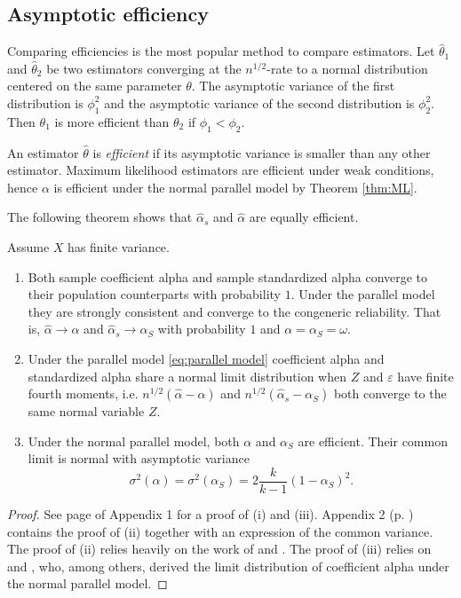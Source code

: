\documentclass[twoside]{article}
\begin{document}
\subsection{Asymptotic efficiency}
Comparing efficiencies is the most popular method to compare estimators. Let $\hat{\theta}_1$ and $\hat{\theta}_2$ be two estimators converging at the $n^{1/2}$-rate to a normal distribution centered on the same parameter $\theta$. The asymptotic variance of the first distribution is $\phi_1^2$ and the asymptotic variance of the second distribution is $\phi_2^2$. Then $\theta_1$ is more efficient than $\theta_2$ if $\phi_1<\phi_2$. 

An estimator $\hat{\theta}$ is \textit{efficient} \citep[][Section 4.3]{Lehmann2004-ke} if its asymptotic variance is smaller than any other estimator. Maximum likelihood estimators are efficient under weak conditions, hence $\alpha$ is efficient under the normal parallel model by Theorem \ref{thm:ML}.  

The following theorem shows that $\hat{\alpha}_s$ and $\hat{\alpha}$ are equally efficient.

\begin{thm}
\label{thm:asymptotics}
Assume $X$ has finite variance. 
\begin{enumerate}[label=(\roman*)]
    \item Both sample coefficient alpha and sample standardized alpha converge to their population counterparts with probability $1$. Under the parallel model they are strongly consistent and converge to the congeneric reliability. That is, $\hat{\alpha}\to\alpha$ and $\hat{\alpha}_s\to\alpha_S$ with probability $1$ and $\alpha = \alpha_S = \omega$.
    \item Under the parallel model \eqref{eq:parallel model} coefficient alpha and standardized alpha share a normal limit distribution when $Z$ and $\varepsilon$ have finite fourth moments, i.e. $n^{1/2}(\hat{\alpha} - \alpha)$ and  $n^{1/2}(\hat{\alpha}_s - \alpha_S)$ both converge to the same normal variable $Z$.
    \item Under the normal parallel model, both $\alpha$ and $\alpha_S$ are efficient. Their common limit is normal with asymptotic variance 
    $$\sigma^{2}(\alpha)= \sigma^{2}(\alpha_S)=2\frac{k}{k-1}(1-\alpha_S)^{2}.$$
\end{enumerate}
\end{thm}    
\begin{proof}
See page \pageref{proof:asymptotics} of Appendix 1 for a proof of (i) and (iii). Appendix 2 (p. \pageref{appendix 2}) contains the proof of (ii) together with an expression of the common variance. The proof of (ii) relies heavily on the work of \citet{Van_Zyl2000-si} and \citet{hayashi2005note}. The proof of (iii) relies on \citet[][eq. 13]{Van_Zyl2000-si} and \citet[][eq. 58]{Kristof1963-tb}, who, among others, derived the limit distribution of coefficient alpha under the normal parallel model.
\end{proof}
\end{document}
